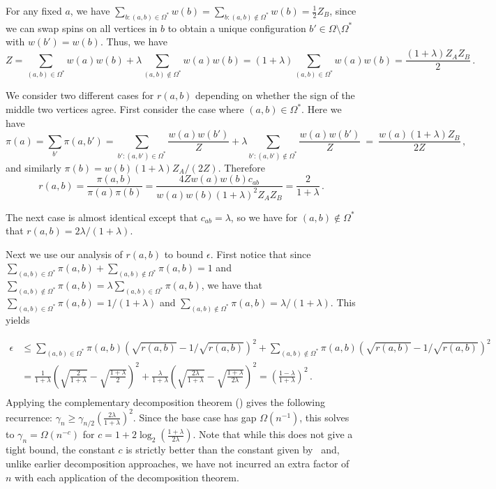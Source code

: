 For any fixed $a$, we have $\sum_{b: (a,b)\in\Omega^*} w(b) = \sum_{b:
(a,b)\notin\Omega^*} w(b)=\frac{1}{2}Z_B$, since we can swap spins 
on all vertices in $b$ to obtain a unique configuration $b'\in\Omega 
\setminus \Omega^*$ with $w(b')=w(b)$.  
Thus, we have
\[Z = \sum_{(a,b) \in \Omega^*}w(a) w(b) + \lambda \sum_{(a,b) \notin
    \Omega^*}w(a)w(b) = (1 + \lambda)\sum_{(a,b) \in \Omega^*}w(a)
  w(b) = \frac{(1+\lambda)Z_AZ_B}{2}\,.\]

We consider two different cases for $r(a,b)$ depending on
whether the sign of the middle two vertices agree.  First consider
the case where $(a,b) \in \Omega^*$. Here we have
\[\pi(a) = \sum_{b'}\pi(a,b') =\sum_{b': (a,b')\in
\Omega^*} \frac{w(a)w(b')}{Z} + \lambda \sum_{b': (a,b')\notin \Omega^*}
\frac{w(a)w(b')}{Z}~=~ \frac{w(a)(1+\lambda)Z_B}{2Z}\,,\]
and similarly $\pi(b) =w(b)(1+\lambda)Z_A/(2Z)$.  Therefore
\[r(a,b)= \frac{\pi(a,b) }{\pi(a)\pi(b)} = \frac{4Zw(a)w(b)
   c_{ab}}{w(a)w(b)(1+\lambda)^2Z_AZ_B} = \frac{2}{1+\lambda}\,.\]

\noindent The next case is almost identical except that $c_{ab} = \lambda$, 
so we have for $(a,b) \notin \Omega^*$ that $r(a,b) = 2\lambda/(1 + \lambda)$.

Next we use our analysis of $r(a,b)$ to bound $\epsilon$. First 
notice that since $\sum_{(a,b) \in \Omega^*} \pi(a,b) + \sum_{(a,b) 
\notin \Omega^*} \pi(a,b)  = 1$ and $\sum_{(a,b) \notin \Omega^*} 
\pi(a,b) = \lambda \sum_{(a,b) \in \Omega^*}\pi(a,b)$, we have that 
$\sum_{(a,b) \in \Omega^*} \pi(a,b) = 1/(1+\lambda)$ and $\sum_{(a,b) 
\notin \Omega^*} \pi(a,b)  = \lambda/(1 + \lambda)$. This yields

\begin{align*}
\epsilon &\leq
 \sum_{(a,b) \in \Omega^*} \pi(a,b)(\sqrt{r(a,b)} -1/\sqrt{r(a,b)})^2  + \sum_{(a,b) \notin \Omega^*} \pi(a,b)(\sqrt{r(a,b)} -1/\sqrt{r(a,b)})^2\\
&= \frac{1}{1+\lambda} \left(\sqrt{ \frac{2}{1+\lambda}} -\sqrt{ \frac{1+\lambda}{2}}\right)^2 + \frac{\lambda}{1+\lambda} \left(\sqrt{\frac{2\lambda}{1+\lambda}} -\sqrt{ \frac{1+\lambda}{2\lambda}}\right)^2 = \left(\frac{1-\lambda}{1+\lambda}\right)^2\,. \\
\end{align*}
%
Applying the complementary decomposition theorem () 
gives the following recurrence: 
$\gamma_{n} \geq \gamma_{n/2}\left(\frac{2\lambda}{1+\lambda}\right)^2.$
Since the base case has gap $\Omega(n^{-1})$, this solves to $\gamma_n
= \Omega(n^{-c})$ for $c = 1 +
2\log_2\left(\frac{1+\lambda}{2\lambda}\right).$  Note that while this
does not give a tight bound, the constant $c$ is strictly better than
the constant given by~\cite{jstv04} and, unlike earlier
decomposition approaches, we have not incurred an extra factor of $n$
with each application of the decomposition theorem. 


